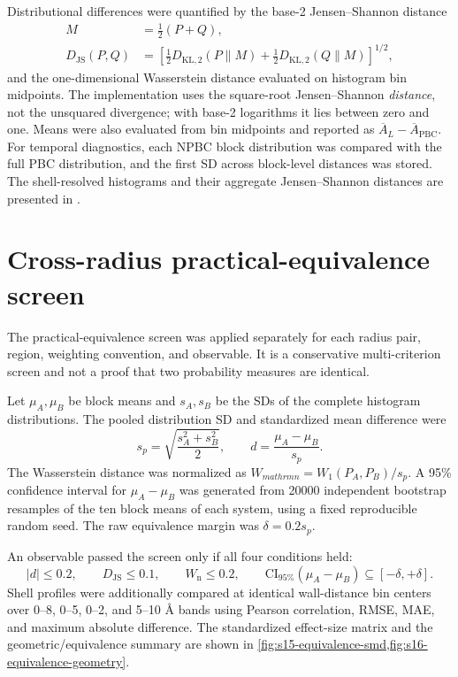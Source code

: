 \documentclass[11pt]{article}
\newcommand{\angstrom}{\text{\AA}}
\newcommand{\PBC}{\mathrm{PBC}}
\begin{document}
Distributional differences were quantified by the base-2 Jensen--Shannon
distance
\begin{align}
 M&=\frac12(P+Q),\\
 D_{\mathrm{JS}}(P,Q)&=
 \left[\frac12D_{\mathrm{KL},2}(P\|M)
      +\frac12D_{\mathrm{KL},2}(Q\|M)\right]^{1/2},
 \label{eq:js}
\end{align}
and the one-dimensional Wasserstein distance evaluated on histogram bin
midpoints.  The implementation uses the square-root Jensen--Shannon
\emph{distance}, not the unsquared divergence; with base-2 logarithms it lies
between zero and one.  Means were also evaluated from bin midpoints and
reported as \(\overline A_L-\overline A_{\PBC}\).  For temporal diagnostics,
each NPBC block distribution was compared with the full PBC distribution,
and the first SD across block-level distances was stored.
The shell-resolved histograms and their aggregate Jensen--Shannon distances
are presented in .

\section{Cross-radius practical-equivalence screen}

The practical-equivalence screen was applied separately for each radius pair,
region, weighting convention, and observable.  It is a conservative
multi-criterion screen and not a proof that two probability measures are
identical.

Let \(\mu_A,\mu_B\) be block means and \(s_A,s_B\) be the SDs of the complete
histogram distributions.  The pooled distribution SD and standardized mean
difference were
\begin{equation}
 s_p=\sqrt{\frac{s_A^2+s_B^2}{2}},
 \qquad d=\frac{\mu_A-\mu_B}{s_p}.
 \label{eq:smd}
\end{equation}
The Wasserstein distance was normalized as
\(W_{mathrm n}=W_1(P_A,P_B)/s_p\).  A 95\% confidence interval for
\(\mu_A-\mu_B\) was generated from 20000 independent bootstrap resamples of
the ten block means of each system, using a fixed reproducible random seed.
The raw equivalence margin was \(\delta=0.2s_p\).

An observable passed the screen only if all four conditions held:
\begin{equation}
 |d|\leq0.2,\qquad
 D_{\mathrm{JS}}\leq0.1,\qquad
 W_{\mathrm n}\leq0.2,\qquad
 \mathrm{CI}_{95\%}(\mu_A-\mu_B)\subseteq[-\delta,+\delta].
 \label{eq:equivalence}
\end{equation}
Shell profiles were additionally compared at identical wall-distance bin
centers over 0--8, 0--5, 0--2, and 5--10 \(\angstrom\) bands using Pearson
correlation, RMSE, MAE, and maximum absolute difference.
The standardized effect-size matrix and the geometric/equivalence summary are
shown in \cref{fig:s15-equivalence-smd,fig:s16-equivalence-geometry}.
\end{document}
